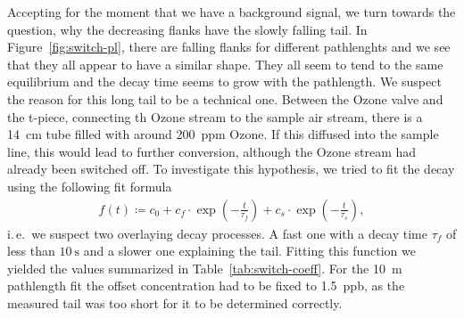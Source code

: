 Accepting for the moment that we have a background  signal, we
turn towards the question, why the decreasing flanks have the slowly
falling tail. In Figure~\ref{fig:switch-pl}, there are falling flanks for
different pathlenghts and we see that they all appear to have a
similar shape. They all seem to tend to the same equilibrium and the
decay time seems to grow with the pathlength. We suspect the reason
for this long tail to be a technical one. Between the Ozone valve and
the t-piece, connecting th Ozone stream to the sample air stream,
there is a \SI{14}{\centi\meter} tube filled with around
\SI{200}{ppm} Ozone. If this diffused into the sample line, this would
lead to further  conversion, although the Ozone stream had 
already been switched off. To investigate this hypothesis, we tried to fit
the decay using the following fit formula
\begin{align}
  f(t) \coloneqq c_0 + c_f \cdot\exp\left( -\frac{t}{\tau_f}\right) +
  c_s \cdot \exp\left(-\frac{t}{\tau_s}\right), \label{eq:switch-fit}
\end{align}
i.\,e.\ we suspect two overlaying decay processes. A fast one with a
decay time $\tau_f$ of less than $\SI{10}{\second}$ and a slower one
explaining the tail. Fitting this function we yielded the values
summarized in Table~\ref{tab:switch-coeff}. For the \SI{10}{\meter}
pathlength fit the offset concentration had to be fixed to
\SI{1.5}{ppb}, as the measured tail was too short for it to be
determined correctly.


